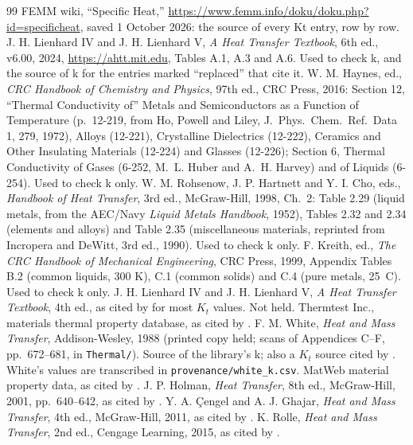 \documentclass[10pt]{article}
\begin{document}
\begin{thebibliography}{99}
 FEMM wiki, ``Specific Heat,'' \url{https://www.femm.info/doku/doku.php?id=specificheat}, saved 1 October 2026: the source of every Kt entry, row by row.
 J. H. Lienhard IV and J. H. Lienhard V, \emph{A Heat Transfer Textbook}, 6th ed., v6.00, 2024, \url{https://ahtt.mit.edu}, Tables A.1, A.3 and A.6. Used to check k, and the source of k for the entries marked ``replaced'' that cite it.
 W. M. Haynes, ed., \emph{CRC Handbook of Chemistry and Physics}, 97th ed., CRC Press, 2016: Section 12, ``Thermal Conductivity of'' Metals and Semiconductors as a Function of Temperature (p.~12-219, from Ho, Powell and Liley, J.~Phys.\ Chem.\ Ref.\ Data 1, 279, 1972), Alloys (12-221), Crystalline Dielectrics (12-222), Ceramics and Other Insulating Materials (12-224) and Glasses (12-226); Section 6, Thermal Conductivity of Gases (6-252, M.~L. Huber and A.~H. Harvey) and of Liquids (6-254). Used to check k only.
 W. M. Rohsenow, J. P. Hartnett and Y. I. Cho, eds., \emph{Handbook of Heat Transfer}, 3rd ed., McGraw-Hill, 1998, Ch.~2: Table 2.29 (liquid metals, from the AEC/Navy \emph{Liquid Metals Handbook}, 1952), Tables 2.32 and 2.34 (elements and alloys) and Table 2.35 (miscellaneous materials, reprinted from Incropera and DeWitt, 3rd ed., 1990). Used to check k only.
 F. Kreith, ed., \emph{The CRC Handbook of Mechanical Engineering}, CRC Press, 1999, Appendix Tables B.2 (common liquids, 300 K), C.1 (common solids) and C.4 (pure metals, 25~\textdegree C). Used to check k only.
 J. H. Lienhard IV and J. H. Lienhard V, \emph{A Heat Transfer Textbook}, 4th ed., as cited by \cite{specheat} for most $K_t$ values. Not held.
 Thermtest Inc., materials thermal property database, as cited by \cite{specheat}.
 F. M. White, \emph{Heat and Mass Transfer}, Addison-Wesley, 1988 (printed copy held; scans of Appendices C--F, pp.~672--681, in \texttt{Thermal/}). Source of the library's k; also a $K_t$ source cited by \cite{specheat}. White's values are transcribed in \texttt{provenance/white\_k.csv}.
 MatWeb material property data, as cited by \cite{specheat}.
 J. P. Holman, \emph{Heat Transfer}, 8th ed., McGraw-Hill, 2001, pp.~640--642, as cited by \cite{specheat}.
 Y. A. \c{C}engel and A. J. Ghajar, \emph{Heat and Mass Transfer}, 4th ed., McGraw-Hill, 2011, as cited by \cite{specheat}.
 K. Rolle, \emph{Heat and Mass Transfer}, 2nd ed., Cengage Learning, 2015, as cited by \cite{specheat}.

\end{thebibliography}
\end{document}
